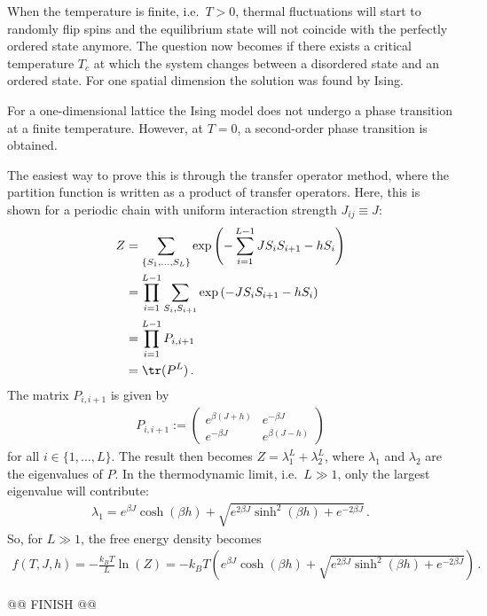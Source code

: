     When the temperature is finite, i.e.~$T>0$, thermal fluctuations will start to randomly flip spins and the equilibrium state will not coincide with the perfectly ordered state anymore. The question now becomes if there exists a critical temperature $T_c$ at which the system changes between a disordered state and an ordered state. For one spatial dimension the solution was found by Ising.
    \begin{property}[$d=1$]
        For a one-dimensional lattice the Ising model does not undergo a phase transition at a finite temperature. However, at $T=0$, a second-order phase transition is obtained.

        The easiest way to prove this is through the transfer operator method, where the partition function is written as a product of transfer operators. Here, this is shown for a periodic chain with uniform interaction strength $J_{ij}\equiv J$:
        \begin{align}
            Z &= \sum_{\{S_1,\ldots,S_L\}}\exp\left(-\sum_{i=1}^{L-1}JS_iS_{i+1}-hS_i\right)\\
            &= \prod_{i=1}^{L-1}\sum_{S_i,S_{i+1}}\exp\left(-JS_iS_{i+1}-hS_i\right)\\
            &= \prod_{i=1}^{L-1}P_{i,i+1}\\
            &= \tr(P^L)\,.
        \end{align}
        The matrix $P_{i,i+1}$ is given by
        \begin{gather}
            P_{i,i+1} :=
            \begin{pmatrix}
                e^{\beta(J+h)}&e^{-\beta J}\\
                e^{-\beta J}&e^{\beta(J-h)}
            \end{pmatrix}
        \end{gather}
        for all $i\in\{1,\ldots,L\}$. The result then becomes $Z=\lambda^L_1+\lambda^L_2$, where $\lambda_1$ and $\lambda_2$ are the eigenvalues of $P$. In the thermodynamic limit, i.e.~$L\gg1$, only the largest eigenvalue will contribute:
        \begin{gather}
            \lambda_1 = e^{\beta J}\cosh(\beta h) + \sqrt{e^{2\beta J}\sinh^2(\beta h)+e^{-2\beta J}}\,.
        \end{gather}
        So, for $L\gg1$, the free energy density becomes
        \begin{gather*}
            f(T,J,h) = -\frac{k_BT}{L}\ln(Z) = -k_BT\left(e^{\beta J}\cosh(\beta h) + \sqrt{e^{2\beta J}\sinh^2(\beta h)+e^{-2\beta J}}\right)\,.
        \end{gather*}

        @@ FINISH @@
    \end{property}

